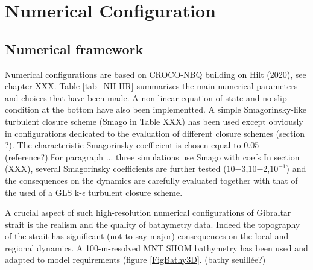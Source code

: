 \section{Numerical Configuration}
\label{section3Dnum}
\subsection{Numerical framework}

\color{blue}Numerical configurations are based on \color{black} CROCO-NBQ building on Hilt (2020), see chapter XXX. \color{black} Table \ref{tab_NH-HR} summarizes \color{blue} the main numerical parameters and choices that have been made. A non-linear equation of state and no-slip condition at the bottom have also been implementted. \color{blue} A simple Smagorinsky-like turbulent closure scheme (Smago in Table XXX) has been used except obviously in configurations dedicated to the evaluation of different closure schemes (section ?). The characteristic Smagorinsky coefficient is chosen equal to 0.05 (reference?).\sout{For paragraph ... three simulations use Smago with coefs} In section (XXX), several Smagorinsky coefficients are further tested  ($10{-3}$,$10{-2}$,$10^{-1}$) and the consequences on the dynamics are carefully evaluated together with that of the used of a GLS k-$\epsilon$ turbulent closure scheme. \color{black}

\color{blue}A crucial aspect of such high-resolution numerical configurations of Gibraltar strait is the realism and the quality of bathymetry data. Indeed the topography of the strait has significant (not to say major) consequences on the local and regional dynamics. A 100-m-resolved MNT SHOM bathymetry has been used and adapted to model requirements (figure \ref{FigBathy3D}. (bathy seuillée?) \color{black}

